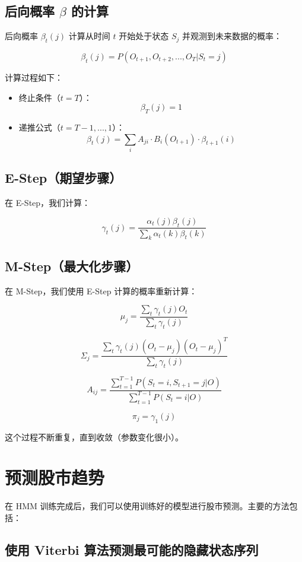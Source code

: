 \documentclass{article}
\begin{document}
\subsection{后向概率 $\beta$ 的计算}

后向概率 $\beta_t(j)$ 计算从时间 $t$ 开始处于状态 $S_j$ 并观测到未来数据的概率：

\[
\beta_t(j) = P(O_{t+1}, O_{t+2}, ..., O_T | S_t = j)
\]

计算过程如下：

\begin{itemize}
    \item 终止条件（$t=T$）：
    \[
    \beta_T(j) = 1
    \]
    \item 递推公式（$t=T-1, ..., 1$）：
    \[
    \beta_t(j) = \sum_{i} A_{ji} \cdot B_i(O_{t+1}) \cdot \beta_{t+1}(i)
    \]
\end{itemize}

\subsection{E-Step（期望步骤）}

在 E-Step，我们计算：

\[
\gamma_t(j) = \frac{\alpha_t(j) \beta_t(j)}{\sum_k \alpha_t(k) \beta_t(k)}
\]

\subsection{M-Step（最大化步骤）}

在 M-Step，我们使用 E-Step 计算的概率重新计算：

\[
\mu_j = \frac{\sum_t \gamma_t(j) O_t}{\sum_t \gamma_t(j)}
\]

\[
\Sigma_j = \frac{\sum_t \gamma_t(j) (O_t - \mu_j)(O_t - \mu_j)^T}{\sum_t \gamma_t(j)}
\]

\[
A_{ij} = \frac{\sum_{t=1}^{T-1} P(S_t = i, S_{t+1} = j | O)}{\sum_{t=1}^{T-1} P(S_t = i | O)}
\]

\[
\pi_j = \gamma_1(j)
\]

这个过程不断重复，直到收敛（参数变化很小）。


\section{预测股市趋势}

在 HMM 训练完成后，我们可以使用训练好的模型进行股市预测。主要的方法包括：

\subsection{使用 Viterbi 算法预测最可能的隐藏状态序列}
\end{document}
